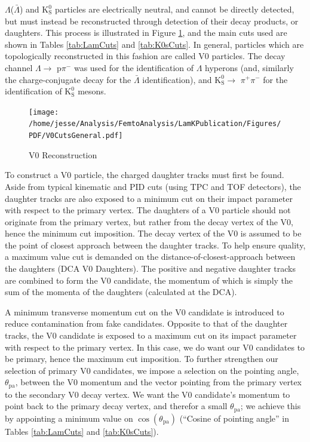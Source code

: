 \documentclass[ALICE,manyauthors]{cernphprep}
\newcommand{\Lam}{$\Lambda$\xspace}
\newcommand{\ALam}{$\bar{\Lambda}$\xspace}
\newcommand{\LamALam}{$\Lambda$($\bar{\Lambda}$)\xspace}
\newcommand{\Ks}{$\mathrm{K^{0}_{S}}$\xspace}
\begin{document}
\LamALam and \Ks particles are electrically neutral, and cannot be directly detected, but must instead be reconstructed through detection of their decay products, or daughters.  
This process is illustrated in Figure \ref{fig:V0Reconstruction}, and the main cuts used are shown in Tables \ref{tab:LamCuts} and \ref{tab:K0sCuts}.
In general, particles which are topologically reconstructed in this fashion are called V0 particles.
The decay channel \Lam $\rightarrow$ p$\pi^{-}$ was used for the identification of \Lam hyperons (and, similarly the charge-conjugate decay for the \ALam identification), and \Ks $\rightarrow$ $\pi^{+}\pi^{-}$ for the identification of \Ks mesons.

\begin{figure}[h]
  \centering
  \texttt{[image: /home/jesse/Analysis/FemtoAnalysis/LamKPublication/Figures/PDF/V0CutsGeneral.pdf]}
  \caption[V0 Reconstruction]{V0 Reconstruction}
  \label{fig:V0Reconstruction}
\end{figure}

To construct a V0 particle, the charged daughter tracks must first be found.  
Aside from typical kinematic and PID cuts (using TPC and TOF detectors), the daughter tracks are also exposed to a minimum cut on their impact parameter with respect to the primary vertex.  
The daughters of a V0 particle should not originate from the primary vertex, but rather from the decay vertex of the V0, hence the minimum cut imposition.  
The decay vertex of the V0 is assumed to be the point of closest approach between the daughter tracks.
To help ensure quality, a maximum value cut is demanded on the distance-of-closest-approach between the daughters (DCA V0 Daughters).
The positive and negative daughter tracks are combined to form the V0 candidate, the momentum of which is simply the sum of the momenta of the daughters (calculated at the DCA).

A minimum transverse momentum cut on the V0 candidate is introduced to reduce contamination from fake candidates.
Opposite to that of the daughter tracks, the V0 candidate is exposed to a maximum cut on its impact parameter with respect to the primary vertex.
In this case, we do want our V0 candidates to be primary, hence the maximum cut imposition.
To further strengthen our selection of primary V0 candidates, we impose a selection on the pointing angle, $\theta_{\mathrm{pa}}$, between the V0 momentum and the vector pointing from the primary vertex to the secondary V0 decay vertex.
We want the V0 candidate's momentum to point back to the primary decay vertex, and therefor a small $\theta_{\mathrm{pa}}$; we achieve this by appointing a minimum value on $\cos(\theta_{\mathrm{pa}})$ (``Cosine of pointing angle'' in Tables \ref{tab:LamCuts} and \ref{tab:K0sCuts}).
\end{document}

